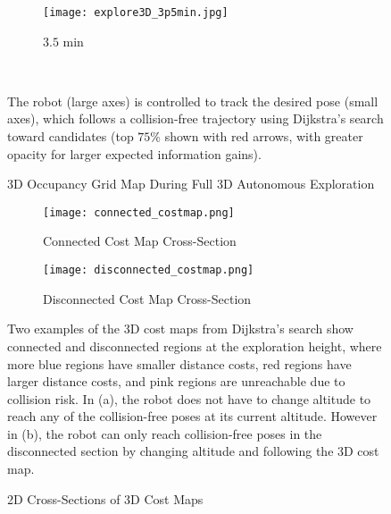 \begin{figure}[!t]
{	\hspace*{0.02\columnwidth}
	\begin{subfigure}[t]{0.3\columnwidth}
           	\centering
          	\texttt{[image: explore3D\_3p5min.jpg]}
        		\caption{$3.5$ min}
    	\end{subfigure}
}
\\
	\caption{3D Occupancy Grid Map During Full 3D Autonomous Exploration}
	\medskip
	\small
	The robot (large axes) is controlled to track the desired pose (small axes), which follows a collision-free trajectory using Dijkstra's search toward candidates (top $75\%$ shown with red arrows, with greater opacity for larger expected information gains).
	\label{fig:exp3DOccMap}
\end{figure}


\begin{figure}[!t]
\centering
    	\begin{subfigure}[t]{0.8\columnwidth}
           	\centering
          	\texttt{[image: connected\_costmap.png]}
        		\caption{Connected Cost Map Cross-Section}
    	\end{subfigure}
    	\begin{subfigure}[t]{0.8\columnwidth}
           	\centering
          	\texttt{[image: disconnected\_costmap.png]}
        		\caption{Disconnected Cost Map Cross-Section}
    	\end{subfigure}
	\caption{2D Cross-Sections of 3D Cost Maps}
	\medskip
	\small
	Two examples of the 3D cost maps from Dijkstra's search show connected and disconnected regions at the exploration height, where more blue regions have smaller distance costs, red regions have larger distance costs, and pink regions are unreachable due to collision risk. In (a), the robot does not have to change altitude to reach any of the collision-free poses at its current altitude. However in (b), the robot can only reach collision-free poses in the disconnected section by changing altitude and following the 3D cost map.
	\label{fig:Full3DExplorationCostmaps}
\end{figure}


